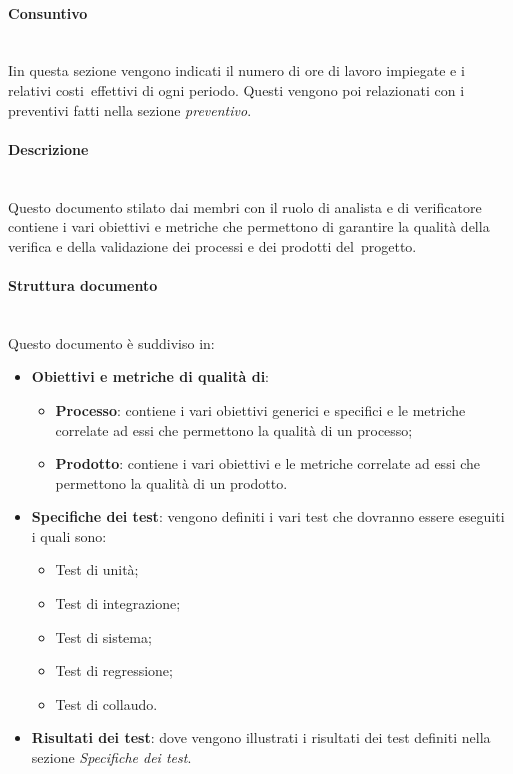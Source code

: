 \paragraph {Consuntivo}\mbox{}\\
Iin questa sezione vengono indicati il numero di ore di lavoro impiegate e i relativi costi effettivi di ogni periodo. Questi vengono poi relazionati con i preventivi fatti nella sezione \textit{preventivo}.

\paragraph {Descrizione}\mbox{}\\
Questo documento stilato dai membri con il ruolo di analista e di verificatore contiene i vari obiettivi e metriche che permettono di garantire la qualità della verifica e della validazione dei processi e dei prodotti del progetto.
\paragraph {Struttura documento}\mbox{}\\
Questo documento è suddiviso in:
\begin{itemize}
	\item \textbf{Obiettivi e metriche di qualità di}:
	\begin{itemize}
		\item \textbf{Processo}: contiene i vari obiettivi generici e specifici e le metriche correlate ad essi che permettono la qualità di un processo;
		\item \textbf{Prodotto}: contiene i vari obiettivi e le metriche correlate ad essi che permettono la qualità di un prodotto.
	\end{itemize}
	\item \textbf{Specifiche dei test}: vengono definiti i vari test che dovranno essere eseguiti i quali sono:
	\begin{itemize}
		\item Test di unità;
		\item Test di integrazione;
		\item Test di sistema;
		\item Test di regressione;
		\item Test di collaudo.
	\end{itemize}
	\item \textbf{Risultati dei test}: dove vengono illustrati i risultati dei test definiti nella sezione \textit{Specifiche dei test}.
\end{itemize} 

